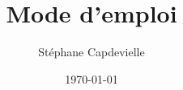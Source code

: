 \newcommand{\templatesroot}{..}



\title{Mode d'emploi}
\author{Stéphane Capdevielle}
\date{\today}


\maketitle

\tableofcontents











